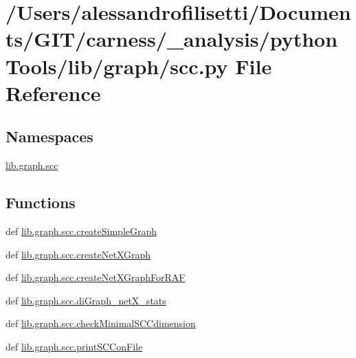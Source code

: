 \hypertarget{a00092}{\section{/\-Users/alessandrofilisetti/\-Documents/\-G\-I\-T/carness/\-\_\-analysis/python\-Tools/lib/graph/scc.py File Reference}
\label{a00092}
}
\subsection*{Namespaces}
\begin{DoxyCompactItemize}
\item 
\hyperlink{a00142}{lib.\-graph.\-scc}
\end{DoxyCompactItemize}
\subsection*{Functions}
\begin{DoxyCompactItemize}
\item 
def \hyperlink{a00142_a7d0d5fec525d92ca329b1b58da0712be}{lib.\-graph.\-scc.\-create\-Simple\-Graph}
\item 
def \hyperlink{a00142_abc47bb4f5ff50cf5d1dd81c007c1e332}{lib.\-graph.\-scc.\-create\-Net\-X\-Graph}
\item 
def \hyperlink{a00142_aff58b86401d5f04b13100aae79560fe7}{lib.\-graph.\-scc.\-create\-Net\-X\-Graph\-For\-R\-A\-F}
\item 
def \hyperlink{a00142_a98b4189c8603e40d7879d606ed4b215a}{lib.\-graph.\-scc.\-di\-Graph\-\_\-net\-X\-\_\-stats}
\item 
def \hyperlink{a00142_a54bdd154f11152272776a28a4abfcf06}{lib.\-graph.\-scc.\-check\-Minimal\-S\-C\-Cdimension}
\item 
def \hyperlink{a00142_a3dbfb9a21bab7b43f8c634a220af08fc}{lib.\-graph.\-scc.\-print\-S\-C\-Con\-File}
\end{DoxyCompactItemize}

